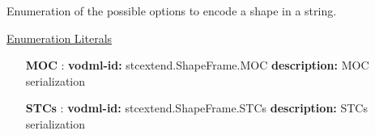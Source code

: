   Enumeration of the possible options to encode a shape in a string.

  \noindent \underline{Enumeration Literals}
  \vspace{-\parsep}
  \small
  \begin{itemize}
  
    \item[\textbf{MOC}]: \textbf{vodml-id:} stcextend.ShapeFrame.MOC \newline
          \textbf{description:} MOC serialization
    \item[\textbf{STCs}]: \textbf{vodml-id:} stcextend.ShapeFrame.STCs \newline
          \textbf{description:} STCs serialization
  \end{itemize}
  \normalsize
